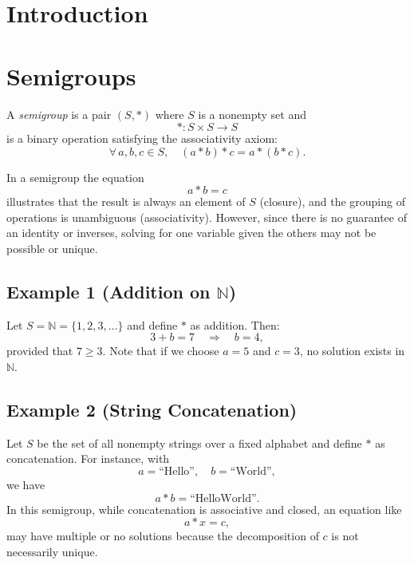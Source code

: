 \documentclass[11pt,openany]{article}
\begin{document}

\newpage

\section{Introduction}


\section{Semigroups}
\begin{definition}[Semigroup]
	A \emph{semigroup} is a pair \((S,\ast)\) where \(S\) is a nonempty set and
	\[
	\ast: S \times S \to S
	\]
	is a binary operation satisfying the associativity axiom:
	\[
	\forall\, a,b,c \in S,\quad (a\ast b)\ast c = a\ast (b\ast c).
	\]
\end{definition}

In a semigroup the equation
\[
a\ast b = c
\]
illustrates that the result is always an element of \(S\) (closure), and the grouping of operations is unambiguous (associativity). However, since there is no guarantee of an identity or inverses, solving for one variable given the others may not be possible or unique.

\subsection*{Example 1 (Addition on \(\mathbb{N}\))} 
Let \(S=\mathbb{N}=\{1,2,3,\dots\}\) and define \(\ast\) as addition. Then:
\[
3+ b = 7 \quad \Longrightarrow \quad b=4,
\]
provided that \(7\ge 3\). Note that if we choose \(a=5\) and \(c=3\), no solution exists in \(\mathbb{N}\).

\subsection*{Example 2 (String Concatenation)}
Let \(S\) be the set of all nonempty strings over a fixed alphabet and define \(\ast\) as concatenation. For instance, with
\[
a = \text{``Hello''}, \quad b = \text{``World''},
\]
we have
\[
a \ast b = \text{``HelloWorld''}.
\]
In this semigroup, while concatenation is associative and closed, an equation like
\[
a \ast x = c,
\]
may have multiple or no solutions because the decomposition of \(c\) is not necessarily unique.
\end{document}
